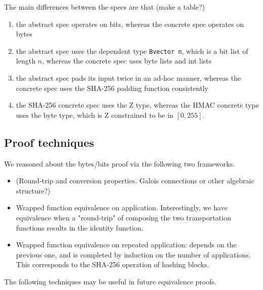 \documentclass[twocolumn,showpacs,%
  nofootinbib,aps,superscriptaddress,%
  eqsecnum,prd,notitlepage,showkeys,10pt]{revtex4-1}
\begin{document}
The main differences between the specs are that (make a table?)
\begin{enumerate} 
\item the abstract spec operates on bits, whereas the concrete spec operates on bytes
\item the abstract spec uses the dependent type \verb|Bvector n|, which is a bit list of length $n$, whereas the concrete spec uses byte lists and int lists
\item the abstract spec pads its input twice in an ad-hoc manner, whereas the concrete spec uses the SHA-256 padding function consistently
\item the SHA-256 concrete spec uses the Z type, whereas the HMAC concrete type uses the byte type, which is Z constrained to be in $[0, 255]$.
\end{enumerate}

\subsection{Proof techniques}

We reasoned about the bytes/bits proof via the following two frameworks.

\begin{itemize}
\item (Round-trip and conversion properties. Galois connections or other algebraic structure?)
\item Wrapped function equivalence on application. Interestingly, we have equivalence when a "round-trip" of composing the two transportation functions results in the identity function.
\item Wrapped function equivalence on repeated application: depends on the previous one, and is completed by induction on the number of applications. This corresponds to the SHA-256 operation of hashing blocks.
\end{itemize}

The following techniques may be useful in future equivalence proofs.
\end{document}
